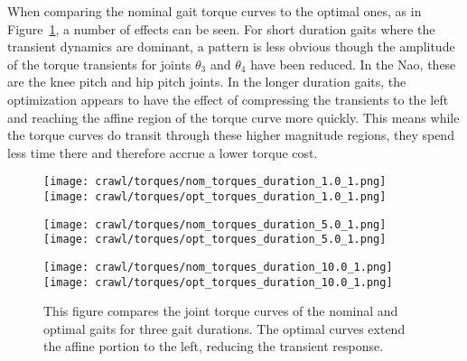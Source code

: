 When comparing the nominal gait torque curves to the optimal ones, as in
Figure~\ref{fig:vrep_comparison_joint_torques_by_duration1}, a number of effects can be seen.
For short duration gaits where the transient dynamics are dominant, a pattern is less
obvious though the amplitude of the torque transients for joints $\theta_3$ and $\theta_4$
have been reduced. In the Nao, these are the knee pitch and hip pitch joints.
In the longer duration gaits, the optimization appears to have the effect of compressing
the transients to the left and reaching the affine region of the torque curve more quickly.
This means while the torque curves do transit through these higher magnitude regions,
they spend less time there and therefore accrue a lower torque cost.

\begin{figure}
\centering
\texttt{[image: crawl/torques/nom\_torques\_duration\_1.0\_1.png]}
\texttt{[image: crawl/torques/opt\_torques\_duration\_1.0\_1.png]}

\centering
\texttt{[image: crawl/torques/nom\_torques\_duration\_5.0\_1.png]}
\texttt{[image: crawl/torques/opt\_torques\_duration\_5.0\_1.png]}

\centering
\texttt{[image: crawl/torques/nom\_torques\_duration\_10.0\_1.png]}
\texttt{[image: crawl/torques/opt\_torques\_duration\_10.0\_1.png]}

\caption{This figure compares the joint torque curves of the nominal and optimal
         gaits for three gait durations. The optimal curves extend the affine portion to the left, 
         reducing the transient response.}
\label{fig:vrep_comparison_joint_torques_by_duration1}
\end{figure}


